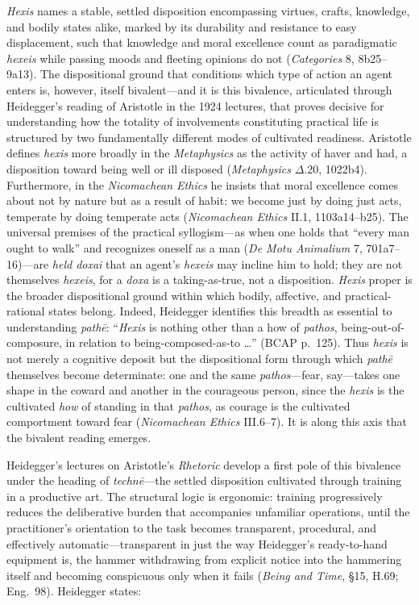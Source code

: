 \textit{Hexis} names a stable, settled disposition encompassing virtues, crafts, knowledge, and bodily states alike, marked by its durability and resistance to easy displacement, such that knowledge and moral excellence count as paradigmatic \textit{hexeis} while passing moods and fleeting opinions do not (\textit{Categories} 8, 8b25--9a13). The dispositional ground that conditions which type of action an agent enters is, however, itself bivalent---and it is this bivalence, articulated through Heidegger's reading of Aristotle in the 1924 lectures, that proves decisive for understanding how the totality of involvements constituting practical life is structured by two fundamentally different modes of cultivated readiness. Aristotle defines \textit{hexis} more broadly in the \textit{Metaphysics} as the activity of haver and had, a disposition toward being well or ill disposed (\textit{Metaphysics} $\Delta$.20, 1022b4). Furthermore, in the \textit{Nicomachean Ethics} he insists that moral excellence comes about not by nature but as a result of habit: we become just by doing just acts, temperate by doing temperate acts (\textit{Nicomachean Ethics} II.1, 1103a14--b25). The universal premises of the practical syllogism---as when one holds that ``every man ought to walk'' and recognizes oneself as a man (\textit{De Motu Animalium} 7, 701a7--16)---are \textit{held doxai} that an agent's \textit{hexeis} may incline him to hold; they are not themselves \textit{hexeis}, for a \textit{doxa} is a taking-as-true, not a disposition. \textit{Hexis} proper is the broader dispositional ground within which bodily, affective, and practical-rational states belong. Indeed, Heidegger identifies this breadth as essential to understanding \textit{pathē}: ``\textit{Hexis} is nothing other than a how of \textit{pathos}, being-out-of-composure, in relation to being-composed-as-to \ldots'' (BCAP p.~125). Thus \textit{hexis} is not merely a cognitive deposit but the dispositional form through which \textit{pathē} themselves become determinate: one and the same \textit{pathos}---fear, say---takes one shape in the coward and another in the courageous person, since the \textit{hexis} is the cultivated \textit{how} of standing in that \textit{pathos}, as courage is the cultivated comportment toward fear (\textit{Nicomachean Ethics} III.6--7). It is along this axis that the bivalent reading emerges.

Heidegger's lectures on Aristotle's \textit{Rhetoric} develop a first pole of this bivalence under the heading of \textit{technē}---the settled disposition cultivated through training in a productive art. The structural logic is ergonomic: training progressively reduces the deliberative burden that accompanies unfamiliar operations, until the practitioner's orientation to the task becomes transparent, procedural, and effectively automatic---transparent in just the way Heidegger's ready-to-hand equipment is, the hammer withdrawing from explicit notice into the hammering itself and becoming conspicuous only when it fails (\textit{Being and Time}, \S15, H.69; Eng.~98). Heidegger states:

